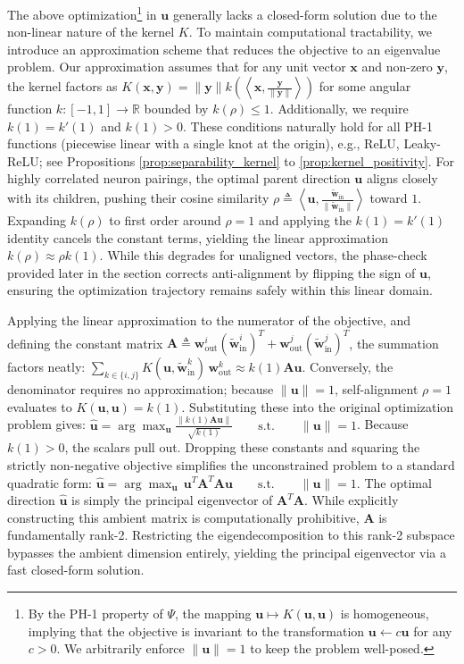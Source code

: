 \documentclass[11pt, a4paper, copyright, gdm]{google}
\newcommand{\normshort}[1]{\lVert#1\rVert}
\newcommand{\inner}[2]{\left\langle#1, #2\right\rangle}
\newcommand{\uVect}{\boldsymbol{u}}
\newcommand{\wVect}{\boldsymbol{w}}
\newcommand{\xVect}{\boldsymbol{x}}
\newcommand{\yVect}{\boldsymbol{y}}
\newcommand{\R}{\mathbb{R}}
\newcommand{\Amat}{\boldsymbol{A}}
\theoremstyle{definition}
\begin{document}
The above optimization\footnote{By the PH-1 property of $\Psi$, the mapping $\uVect \mapsto K(\uVect, \uVect)$ is homogeneous, implying that the objective is invariant to the transformation $\uVect \leftarrow c \uVect$ for any $c > 0$. We arbitrarily enforce $\|\uVect\|=1$ to keep the problem well-posed.} in $\uVect$ generally lacks a closed-form solution due to the non-linear nature of the kernel $K$. To maintain computational tractability, we introduce an approximation scheme that reduces the objective to an eigenvalue problem. Our approximation assumes that for any unit vector $\xVect$ and non-zero $\yVect$, the kernel factors as $K(\xVect,\yVect) = \normshort{\yVect} k\left( \inner{\xVect}{\frac{\yVect}{\normshort{\yVect}}} \right)$ for some angular function $k : [-1,1] \rightarrow \R$ bounded by $k(\rho) \leq 1$. Additionally, we require $k(1) = k'(1)$ and $k(1) > 0$. These conditions naturally hold for all PH-1 functions (piecewise linear with a single knot at the origin), e.g., ReLU, Leaky-ReLU; see Propositions \ref{prop:separability_kernel} to \ref{prop:kernel_positivity}. For highly correlated neuron pairings, the optimal parent direction $\uVect$ aligns closely with its children, pushing their cosine similarity $\rho \triangleq \inner{\uVect}{\frac{\tilde{\wVect}_{\text{in}}}{\normshort{\tilde{\wVect}_{\text{in}}}}}$ toward $1$. Expanding $k(\rho)$ to first order around $\rho = 1$ and applying the $k(1) = k'(1)$ identity cancels the constant terms, yielding the linear approximation $k(\rho) \approx \rho k(1)$. While this degrades for unaligned vectors, the phase-check provided later in the section corrects anti-alignment by flipping the sign of $\uVect$, ensuring the optimization trajectory remains safely within this linear domain.

Applying the linear approximation to the numerator of the objective, and defining the constant matrix $\Amat \triangleq \wVect^i_{\text{out}} (\tilde{\wVect}^i_{\text{in}})^T + \wVect^j_{\text{out}} (\tilde{\wVect}^j_{\text{in}})^T$, the summation factors neatly: $ \sum_{k \in \{i,j\}} K(\uVect, \tilde{\wVect}^k_{\text{in}}) \, \wVect^k_{\text{out}} \approx k(1) \Amat \uVect$. Conversely, the denominator requires no approximation; because $\normshort{\uVect}=1$, self-alignment $\rho=1$ evaluates to $K(\uVect, \uVect) = k(1)$. Substituting these into the original optimization problem gives: $ \widehat{\uVect} = \arg\max_{\uVect} \frac{\normshort{k(1) \Amat \uVect}}{\sqrt{k(1)}} \qquad\mbox{s.t.}\qquad \normshort{\uVect}=1 $. Because $k(1) > 0$, the scalars pull out. Dropping these constants and squaring the strictly non-negative objective simplifies the unconstrained problem to a standard quadratic form: $ \widehat{\uVect} = \arg\max_{\uVect} \, \uVect^T \Amat^T \Amat \uVect \qquad\mbox{s.t.}\qquad \normshort{\uVect}=1$. The optimal direction $\widehat{\uVect}$ is simply the principal eigenvector of $\Amat^T \Amat$. While explicitly constructing this ambient matrix is computationally prohibitive, $\Amat$ is fundamentally rank-2. Restricting the eigendecomposition to this rank-2 subspace bypasses the ambient dimension entirely, yielding the principal eigenvector via a fast closed-form solution.
\end{document}
